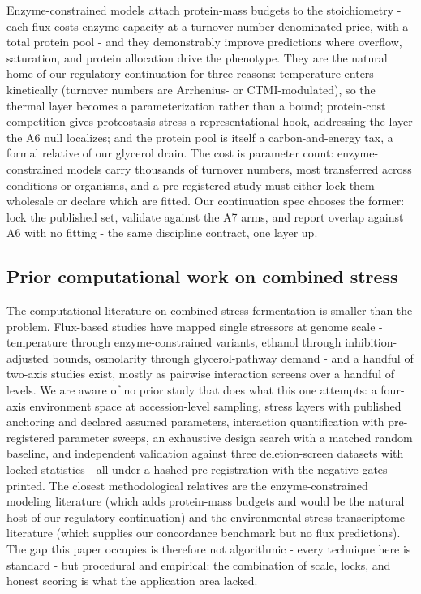 \documentclass[12pt]{article}
\begin{document}
Enzyme-constrained models attach protein-mass budgets to the
stoichiometry - each flux costs enzyme capacity at a
turnover-number-denominated price, with a total protein pool - and
they demonstrably improve predictions where overflow, saturation,
and protein allocation drive the phenotype. They are the natural
home of our regulatory continuation for three reasons: temperature
enters kinetically (turnover numbers are Arrhenius- or
CTMI-modulated), so the thermal layer becomes a parameterization
rather than a bound; protein-cost competition gives proteostasis
stress a representational hook, addressing the layer the A6 null
localizes; and the protein pool is itself a carbon-and-energy tax, a
formal relative of our glycerol drain. The cost is parameter count:
enzyme-constrained models carry thousands of turnover numbers, most
transferred across conditions or organisms, and a pre-registered
study must either lock them wholesale or declare which are fitted.
Our continuation spec chooses the former: lock the published set,
validate against the A7 arms, and report overlap against A6 with no
fitting - the same discipline contract, one layer up.

\subsection{Prior computational work on combined stress}

The computational literature on combined-stress fermentation is
smaller than the problem. Flux-based studies have mapped single
stressors at genome scale - temperature through enzyme-constrained
variants, ethanol through inhibition-adjusted bounds, osmolarity
through glycerol-pathway demand - and a handful of two-axis studies
exist, mostly as pairwise interaction screens over a handful of
levels. We are aware of no prior study that does what this one
attempts: a four-axis environment space at accession-level sampling,
stress layers with published anchoring and declared assumed
parameters, interaction quantification with pre-registered parameter
sweeps, an exhaustive design search with a matched random baseline,
and independent validation against three deletion-screen datasets with
locked statistics - all under a hashed pre-registration with the
negative gates printed. The closest methodological relatives are the
enzyme-constrained modeling literature (which adds protein-mass
budgets and would be the natural host of our regulatory continuation)
and the environmental-stress transcriptome literature (which supplies
our concordance benchmark but no flux predictions). The gap this
paper occupies is therefore not algorithmic - every technique here is
standard - but procedural and empirical: the combination of scale,
locks, and honest scoring is what the application area lacked.
\end{document}
